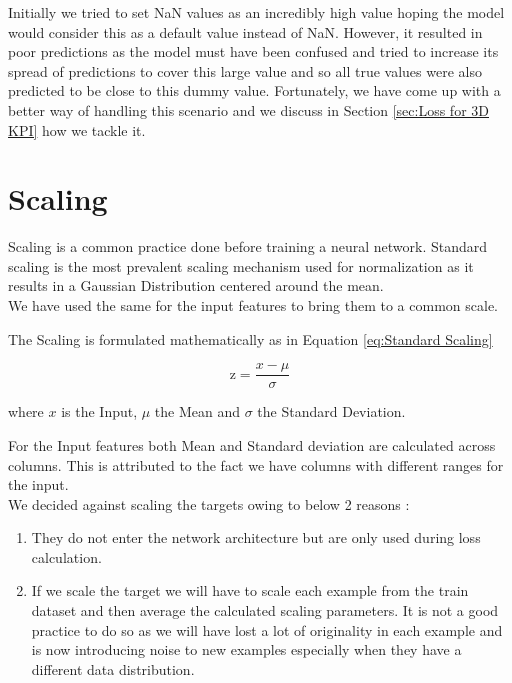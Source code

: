 \documentclass{report} %
\begin{document}
Initially we tried to set \ac{NaN} values as an incredibly high value hoping the model would consider this as a default value instead of \ac{NaN}.
However, it resulted in poor predictions as the model must have been confused and tried to increase its spread of predictions to cover this large value and so all true values were also predicted to be close to this dummy value.
Fortunately, we have come up with a better way of handling this scenario and we discuss in Section \ref{sec:Loss for 3D KPI} how we tackle it.

\section{Scaling}\label{sec:Scaling}

Scaling is a common practice done before training a neural network. 
Standard scaling is the most prevalent scaling mechanism used for normalization as it results in a Gaussian Distribution centered around the mean. \\
We have used the same for the input features to bring them to a common scale. 

The Scaling is formulated mathematically as in Equation \ref{eq:Standard Scaling}

\begin{equation}
    \text{z} = \frac{x - \mu}{\sigma}
    \label{eq:Standard Scaling}
\end{equation} 

where $x$ is the Input, $\mu$ the Mean and $\sigma$ the Standard Deviation.

For the Input features both Mean and Standard deviation are calculated across columns. This is attributed to the fact we have columns with different ranges for the input.\\ 

We decided against scaling the targets owing to below 2 reasons :
\begin{enumerate}
    \item They do not enter the network architecture but are only used during loss calculation.
    \item If we scale the target we will have to scale each example from the train dataset and then average the calculated scaling parameters.
    It is not a good practice to do so as we will have lost a lot of originality in each example and is now introducing noise to new examples especially when they have a different data distribution.\\
\end{enumerate}
\end{document}
